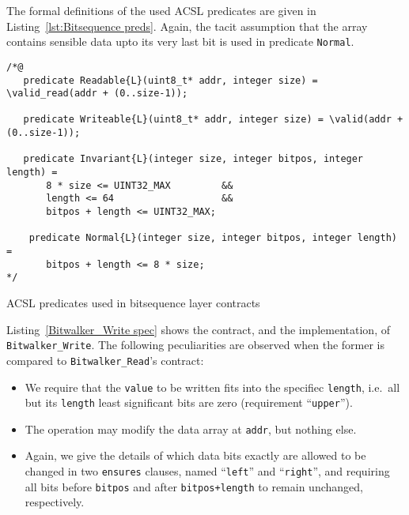 The formal definitions of the used ACSL predicates are given in
Listing~\ref{lst:Bitsequence preds}.
%
Again, the tacit assumption that the array contains sensible data
upto its very last bit is used in predicate \lstinline{Normal}.









\begin{listing}[hbt]
\begin{minipage}{0.99\textwidth}
\begin{lstlisting}[style=acsl-block]
/*@
   predicate Readable{L}(uint8_t* addr, integer size) = \valid_read(addr + (0..size-1));

   predicate Writeable{L}(uint8_t* addr, integer size) = \valid(addr + (0..size-1));

   predicate Invariant{L}(integer size, integer bitpos, integer length) =
       8 * size <= UINT32_MAX         &&
       length <= 64                   &&
       bitpos + length <= UINT32_MAX;

    predicate Normal{L}(integer size, integer bitpos, integer length) =
       bitpos + length <= 8 * size;
*/
\end{lstlisting}
\end{minipage}
\caption{\label{lst:Bitsequence preds} ACSL predicates used in bitsequence layer contracts}
\end{listing}





Listing~\ref{Bitwalker_Write spec} shows the contract, and the
implementation, of
\lstinline{Bitwalker_Write}.
%
The following peculiarities are observed when the former is
compared to \lstinline{Bitwalker_Read}'s contract:
%
\begin{itemize}
\item We require that the \lstinline{value} to be written fits into
the specifiec
	\lstinline{length}, i.e.\ all but its \lstinline{length}
	least significant bits are
	zero (requirement ``\lstinline{upper}'').
\item The operation may modify the data array at \lstinline{addr},
but nothing else.
\item Again, we give the details of which data bits exactly
	are allowed to be changed in two
	\lstinline{ensures} clauses, named ``\lstinline{left}'' and
	``\lstinline{right}'', and requiring all bits before
	\lstinline{bitpos} and after
	\lstinline{bitpos+length} to remain unchanged, respectively.
\end{itemize}

